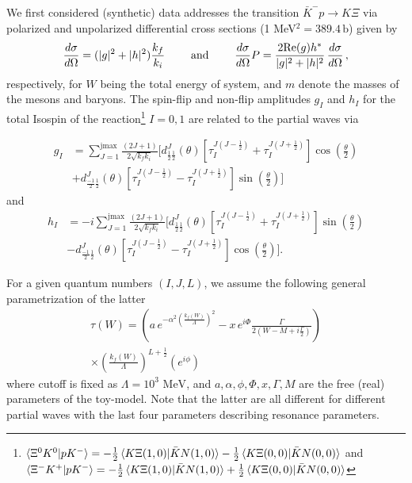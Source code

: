 \documentclass[aps, prd, twocolumn, showpacs, superscriptaddress,
preprintnumbers, nofootinbib]{revtex4-1}
\begin{document}
We first considered (synthetic) data addresses the transition $\bar K^-p\to K\Xi$ via polarized and unpolarized differential cross sections 
(1 MeV$^2=389.4\,\text{b}$) given by
\begin{align}
\frac{d\sigma}{d\Omega}=(|g|^2+|h|^2) \frac{k_f}{k_i}
\qquad\text{ and }\qquad
\frac{d\sigma}{d\Omega}P=\frac{2 \space \text{Re}(g)h^{*}}{|g|^2+|h|^2} \, \frac{d\sigma}{d\Omega}\,,
\end{align}
respectively, for $W$ being the total energy of system, and $m$ denote the masses of the mesons and baryons.
The spin-flip and non-flip amplitudes $g_I$ and $h_I$ for the total Isospin of the reaction\footnote{$\braket{\Xi^0 K^0 | p K^-}= - \frac{1}{2}\braket{K\Xi(1,0)|\bar KN (1,0)}- \frac{1}{2}\braket{K\Xi(0,0)|\bar KN (0,0)}$ and 
{$\braket{\Xi^- K^+ | p K^-}= - \frac{1}{2}\braket{K\Xi(1,0)|\bar KN (1,0)}+ \frac{1}{2}\braket{K\Xi(0,0)|\bar KN (0,0)}$}} $I=0,1$ are related to the partial waves via

\begin{equation}
\begin{split}
g_I&=\sum_{J=1}^{\text{jmax}} \frac{(2J+1)}{2 \sqrt{k_f  k_i}} \biggl[d^J_{\frac{1}{2} \frac{1}{2}}(\theta)[\tau^{J(J-\frac{1}{2})}_I+\tau^{J(J+\frac{1}{2})}_I]\cos(\frac{\theta}{2}) \\
& + d^J_{\frac{-1}{2} \frac{1}{2}}(\theta)[\tau^{J(J-\frac{1}{2})}_I-\tau^{J(J+\frac{1}{2})}_I]\sin(\frac{\theta}{2})\biggr] 
\end{split}
\end{equation}
and
\begin{equation}
\begin{split}
h_I&=-i\sum_{J=1}^{\text{jmax}} \frac{(2J+1)}{2 \sqrt{k_f  k_i}} \biggl[d^J_{\frac{1}{2} \frac{1}{2}}(\theta)[\tau^{J(J-\frac{1}{2})}_I+\tau^{J(J+\frac{1}{2})}_I]\sin(\frac{\theta}{2}) \\
&- d^J_{\frac{-1}{2} \frac{1}{2}}(\theta)[\tau^{J(J-\frac{1}{2})}_I-\tau^{J(J+\frac{1}{2})}_I]\cos(\frac{\theta}{2})\biggr].
\end{split}
\end{equation}


For a given quantum numbers $(I,J,L)$, we assume the following general parametrization of the latter
\begin{equation}
\begin{gathered}
\tau(W)= \left(a\,e^{-\alpha^2 (\frac{k_f(W)}{\Lambda})^2} -x\,e^{i\Phi} \frac{\Gamma}{2(W-M+i \frac{\Gamma}{2})} \right)\\
\times \left(\frac{k_f(W)}{\Lambda} \right) ^{L+\frac{1}{2}} \left( e^{i \phi} \right)
\end{gathered}
\end{equation}
where cutoff is fixed as $\Lambda=10^3 \text{ MeV}$, and $a,\alpha, \phi,\Phi,x, \Gamma,M$ are the free (real) parameters of the toy-model. Note that 
the latter are all different for different partial waves with the last four parameters describing resonance parameters.  
\end{document}
